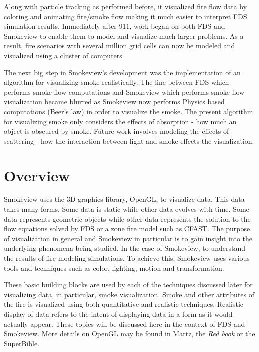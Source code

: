\documentclass[11pt,twoside]{book}
\begin{document}
Along with particle tracking as performed before, it visualized fire flow data by coloring and animating fire/smoke flow making it much easier to interpret FDS simulation results.  Immediately after 911, work began on both FDS and Smokeview to enable them to model and visualize much larger problems.  As a result, fire scenarios with several million grid cells can now be modeled and visualized using a cluster of computers.

The next big step in Smokeview's development was the implementation of an algorithm for visualizing smoke realistically.   The line between FDS which performs smoke flow computations and Smokeview which performs smoke flow visualization became blurred as Smokeview now performs Physics based computations (Beer's law) in order to visualize the smoke.  The present algorithm for visualizing smoke only considers the effects of absorption - how much an object is obscured by smoke.  Future work involves modeling the effects of scattering - how the interaction between light and smoke effects the visualization.


\section{Overview}
Smokeview uses the 3D graphics library, OpenGL, to visualize data.
This data takes many forms.  Some data is static while other data evolves with time.
Some data represents geometric objects while other data represents the solution to the flow equations solved by FDS or a zone fire model such as CFAST.
The purpose of visualization in general and Smokeview in particular is to gain insight into the underlying phenomena being studied.  In the case of Smokeview, to
understand the results of fire modeling simulations.  To achieve this, Smokeview
uses various tools and techniques such as color, lighting, motion and transformation.

These basic building blocks are used by each of the techniques discussed later for visualizing data, in particular, smoke visualization.  Smoke and other attributes of the fire is visualized using both quantitative and realistic techniques.  Realistic display of data refers to the intent of displaying data in a form as it would actually appear.
These topics will be discussed here in the context of FDS and Smokeview.
More details on OpenGL may be found in Martz\cite{martz:06}, 
the {\em Red book}\cite{OpenGLRed} or the SuperBible\cite{SUPERBIBLE}.
\end{document}
